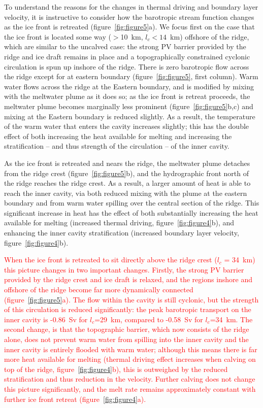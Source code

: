\documentclass[draft]{agujournal2019}
\begin{document}
To understand the reasons for the changes in thermal driving and boundary layer velocity, it is instructive to consider how the barotropic stream function changes as the ice front is retreated (figure~\ref{fig:figure5}a). We focus first on the case that the ice front is located some way ($>$10~km, $l_c<14$~km) offshore of the ridge, which are similar to the uncalved case: the strong PV barrier provided by the ridge and ice draft remains in place and a topographically constrained cyclonic circulation is spun up inshore of the ridge. There is zero barotropic flow across the ridge except for at eastern boundary (figure~\ref{fig:figure5}, first column). Warm water flows across the ridge at the Eastern boundary, and is modified by mixing with the meltwater plume as it does so; as the ice front is retreat proceeds, the meltwater plume becomes marginally less prominent (figure~\ref{fig:figure5}b,c) and mixing at the Eastern boundary is reduced slightly. As a result, the temperature of the warm water that enters the cavity increases slightly; this has the double effect of both increasing the heat available for melting and increasing the stratification -- and thus strength of the circulation -- of the inner cavity.

As the ice front is retreated and nears the ridge, the meltwater plume detaches from the ridge crest (figure~\ref{fig:figure5}b), and  the hydrographic front north of the ridge reaches the ridge crest. As a result, a larger amount of heat is able to reach the inner cavity, via both reduced mixing with the plume at the eastern boundary and from warm water spilling over the central section of the ridge. This significant increase in heat has the effect of both substantially increasing the heat available for melting (increased thermal driving, figure~\ref{fig:figure4}b), and enhancing the inner cavity stratification (increased boundary layer velocity, figure~\ref{fig:figure4}b).

\textcolor{red}{When the ice front is retreated to sit directly above the ridge crest ($l_c$ = 34~km) this picture changes in two important changes. Firstly, the strong PV barrier provided by the ridge crest and ice draft is relaxed, and the regions inshore and offshore of the ridge become far more dynamically connected (figure~\ref{fig:figure5}a). The flow within the cavity is still cyclonic, but the strength of this circulation is reduced significantly: the peak barotropic transport on the inner cavity is -0.86~Sv for $l_c$=29~km, compared to -0.58~Sv for $l_c$=34~km. The second change, is that the topographic barrier, which now consists of the ridge alone, does not prevent warm water from spilling into the inner cavity and the inner cavity is entirely flooded with warm water; although this means there is far more heat available for melting (thermal driving effect increases when calving on top of the ridge, figure~\ref{fig:figure4}b), this is outweighed by the reduced stratification and thus reduction in the velocity. Further calving does not change this picture significantly, and the melt rate remains approximately constant with further ice front retreat (figure~\ref{fig:figure4}a).}
\end{document}
